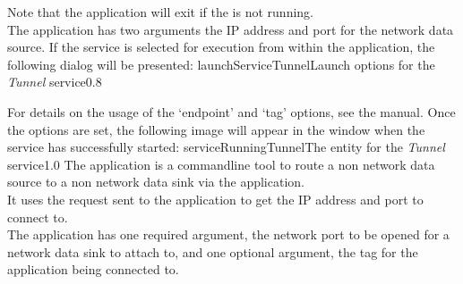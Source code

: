 Note that the application will exit if the  is not
running.\\

The application has two arguments \longDash{} the IP address and port for the network data
source.
\insertAutoAppParameters
{}
\condPage
If the service is selected for execution from within the \emph{\CMU} application, the
following dialog will be presented:
%
{launchServiceTunnel}{Launch options for the \emph{Tunnel} service}{0.8}

For details on the usage of the `endpoint' and `tag' options, see the \emph{\CMU} manual.
Once the options are set, the following image will appear in the \emph{\CMU} window when
the service has successfully started:
%
{serviceRunningTunnel}{The \emph{\CMU} entity for the \emph{Tunnel} service}{1.0}
\condPage
{}
The  application is a command\longDash{}line tool to route a
non\longDash\yarp{} network data source to a non\longDash\yarp{} network data sink via
the  application.\\

It uses the  request sent to the
 application to get the IP address and port to connect
to.\\

The application has one required argument, the network port to be opened for a network
data sink to attach to, and one optional argument, the tag for the
 application being connected to.
\insertShortClientParameters
{}
\secondaryEnd
\primaryEnd{}
